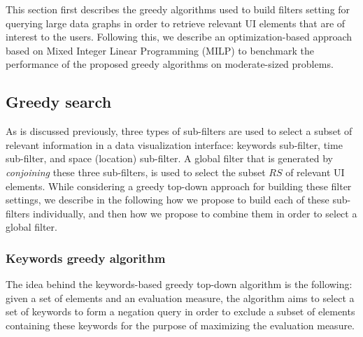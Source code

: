 This section first describes the greedy algorithms used to build filters setting for querying large data graphs in order to retrieve relevant UI elements that are of interest to the users.  Following this, we describe an optimization-based approach based on Mixed Integer Linear Programming (MILP) to benchmark the performance of the proposed greedy algorithms on moderate-sized problems.

\subsection{Greedy search}


As is discussed previously, three types of sub-filters are used to select a subset of relevant information in a data visualization interface: keywords sub-filter, time sub-filter, and space (location) sub-filter.  A global filter that is generated by \emph{conjoining} these three sub-filters, is used to select the subset $RS$ of relevant UI elements. While considering a greedy top-down approach for building these filter settings, we describe in the following how we propose to build each of these sub-filters individually, and then how we propose to combine them in order to select a global filter.

\subsubsection{Keywords greedy algorithm}
The idea behind the keywords-based greedy top-down algorithm is the following: given a set of elements and an evaluation measure, the algorithm aims to select a set of keywords to form a negation query in order to exclude a subset of elements containing these keywords for the purpose of maximizing the evaluation measure.

